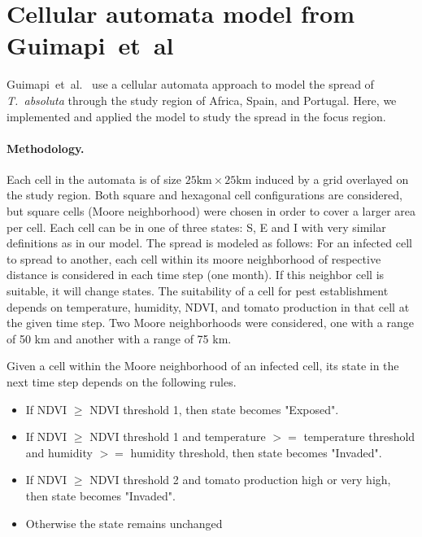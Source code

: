 \documentclass[10pt]{article}
\newcommand{\aacomment}[1]{({\color{magenta}AA: #1})}
\theoremstyle{definition}
\newcommand{\tuta}{\emph{T.~absoluta}}
\begin{document}
\section{Cellular automata model from Guimapi~et~al}
\label{sec:guimapi}
Guimapi~et~al.~\cite{guimapi2016modeling} use a cellular automata approach
to model the spread of \tuta{} through the study region of Africa, Spain, and Portugal. 
Here, we implemented and applied the model to study the spread in the focus
region.
\paragraph{Methodology.}
Each cell in the automata is of size $25\mathrm{km}\times25\mathrm{km}$ induced by a
grid overlayed on the study region. Both square and hexagonal cell
configurations are considered, but square cells (Moore neighborhood) were
chosen in order to cover a larger area per cell.
Each cell can be in one of three states: S, E and I with very similar
definitions as in our model.
The spread is modeled as follows:
For an infected cell to spread to another, each cell within its moore
neighborhood of respective distance is considered in each time step (one month). If this neighbor cell is
suitable, it will change states. The suitability of a cell for pest
establishment depends on temperature, humidity, NDVI, and tomato production
in that cell at the given time step.
Two Moore neighborhoods were
considered, one with a range of 50 km and another with a range of 75 km.

Given a cell within the Moore neighborhood of an infected cell, its state
in the next time step depends on the following rules.
\begin{itemize} 
\item If NDVI $\ge$ NDVI threshold 1, then state becomes "Exposed".
\item If NDVI $\ge$ NDVI threshold 1 and temperature $>=$ temperature threshold and humidity $>=$ humidity threshold, then state becomes "Invaded".
\item If NDVI $\ge$ NDVI threshold 2 and tomato production high or very high, then state becomes "Invaded".
\item Otherwise the state remains unchanged
\end{itemize}
\end{document}
